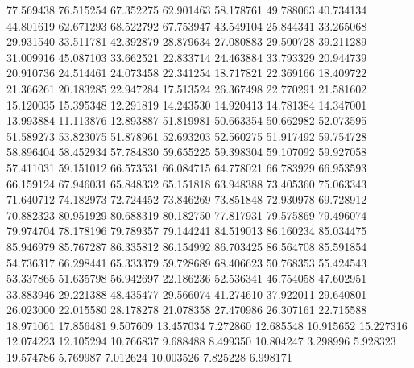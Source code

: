 77.569438
76.515254
67.352275
62.901463
58.178761
49.788063
40.734134
44.801619
62.671293
68.522792
67.753947
43.549104
25.844341
33.265068
29.931540
33.511781
42.392879
28.879634
27.080883
29.500728
39.211289
31.009916
45.087103
33.662521
22.833714
24.463884
33.793329
20.944739
20.910736
24.514461
24.073458
22.341254
18.717821
22.369166
18.409722
21.366261
20.183285
22.947284
17.513524
26.367498
22.770291
21.581602
15.120035
15.395348
12.291819
14.243530
14.920413
14.781384
14.347001
13.993884
11.113876
12.893887
51.819981
50.663354
50.662982
52.073595
51.589273
53.823075
51.878961
52.693203
52.560275
51.917492
59.754728
58.896404
58.452934
57.784830
59.655225
59.398304
59.107092
59.927058
57.411031
59.151012
66.573531
66.084715
64.778021
66.783929
66.953593
66.159124
67.946031
65.848332
65.151818
63.948388
73.405360
75.063343
71.640712
74.182973
72.724452
73.846269
73.851848
72.930978
69.728912
70.882323
80.951929
80.688319
80.182750
77.817931
79.575869
79.496074
79.974704
78.178196
79.789357
79.144241
84.519013
86.160234
85.034475
85.946979
85.767287
86.335812
86.154992
86.703425
86.564708
85.591854
54.736317
66.298441
65.333379
59.728689
68.406623
50.768353
55.424543
53.337865
51.635798
56.942697
22.186236
52.536341
46.754058
47.602951
33.883946
29.221388
48.435477
29.566074
41.274610
37.922011
29.640801
26.023000
22.015580
28.178278
21.078358
27.470986
26.307161
22.715588
18.971061
17.856481
9.507609
13.457034
7.272860
12.685548
10.915652
15.227316
12.074223
12.105294
10.766837
9.688488
8.499350
10.804247
3.298996
5.928323
19.574786
5.769987
7.012624
10.003526
7.825228
6.998171
